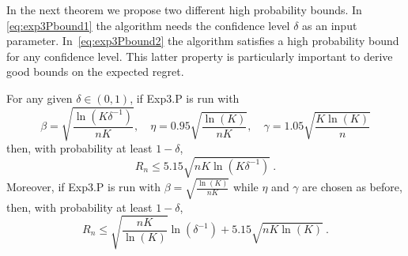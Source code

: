\documentclass[11pt]{hackednow}
\begin{document}
In the next theorem we propose two different high probability bounds. In \eqref{eq:exp3Pbound1} the algorithm needs the confidence level $\delta$ as an input parameter. In~\eqref{eq:exp3Pbound2} the algorithm satisfies a high probability bound for any confidence level. This latter property is particularly important to derive good bounds on the expected regret.
%
\begin{theorem} \label{th:exp3P}
For any given $\delta \in (0,1)$, if Exp3.P is run with
\[
    \beta = \sqrt{\frac{\ln(K \delta^{-1})}{n K}}, \quad \eta = 0.95 \sqrt{\frac{\ln(K)}{n K}}, \quad \gamma = 1.05 \sqrt{\frac{K \ln(K)}{n}}
\]
then, with probability at least $1-\delta$,
\begin{equation} \label{eq:exp3Pbound1}
R_n \leq 5.15 \sqrt{n K \ln(K \delta^{-1})}~.
\end{equation}
Moreover, if Exp3.P is run with
$
    \beta = \sqrt{\tfrac{\ln(K)}{n K}} %
$
while $\eta$ and $\gamma$ are chosen as before, then, with probability at least $1-\delta$,
\begin{equation} \label{eq:exp3Pbound2}
R_n \leq \sqrt{\frac{n K}{\ln(K)}} \ln(\delta^{-1}) + 5.15 \sqrt{n K \ln(K)}~.
\end{equation}
\end{theorem}
%
\end{document}
